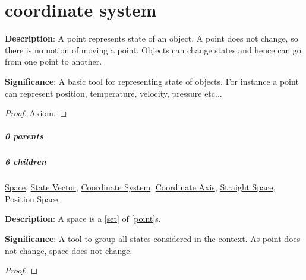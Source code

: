 \documentclass[../main.tex]{subfiles}
\begin{document}
\chapter{coordinate system}


\begin{statement}
\label{statement:Point}\hspace*{0pt}\par
\end{statement}
\textbf{Description}:
A point represents state of an object.
A point does not change, so there is no notion of moving a point.
Objects can change states and hence can go from one point to another.
\par
{\color{magenta} \textbf{Significance}:
A basic tool for representing state of objects.
For instance a point can represent position, temperature, velocity, pressure etc...
\par}
\begin{proof}Axiom.\end{proof}\par
\paragraph{0 parents} 
\paragraph{6 children} \hyperref[statement:Space]{Space}, \hyperref[statement:State Vector]{State Vector}, \hyperref[statement:Coordinate System]{Coordinate System}, \hyperref[statement:Coordinate Axis]{Coordinate Axis}, \hyperref[statement:Straight Space]{Straight Space}, \hyperref[statement:Position Space]{Position Space}, 



\begin{statement}
\label{statement:Space}\hspace*{0pt}\par
\end{statement}
\textbf{Description}:
A space is a [\hyperref[statement:Set]{set}] of [\hyperref[statement:Point]{point}]s.
\par
{\color{magenta} \textbf{Significance}:
A tool to group all states considered in the context.
As point does not change, space does not change.
\par}
\begin{proof}
\proofbydefinition
\end{proof}\par
\end{document}
